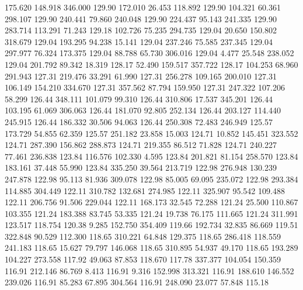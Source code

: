  175.620  148.918  346.000       129.90
 172.010   26.453  118.892       129.90
 104.321   60.361  298.107       129.90
 240.441   79.860  240.048       129.90
 224.437   95.143  241.335       129.90
 283.714  113.291   71.243       129.18
 102.726   75.235  294.735       129.04
  20.650  150.802  318.679       129.04
 193.295   94.238   15.141       129.04
 237.246   75.585  237.345       129.04
 297.977   76.324  173.375       129.04
  88.788   65.730  306.016       129.04
   4.477   25.548  238.052       129.04
 201.792   89.342   18.319       128.17
  52.490  159.517  357.722       128.17
 104.253   68.960  291.943       127.31
 219.476   33.291   61.990       127.31
 256.278  109.165  200.010       127.31
 106.149  154.210  334.670       127.31
 357.562   87.794  159.950       127.31
 247.322  107.206   58.299       126.44
 348.111  101.079   99.310       126.44
 310.806   17.537  345.201       126.44
 103.195   61.069  306.063       126.44
 181.070   92.805  252.134       126.44
 203.127  114.440  245.915       126.44
 186.332   30.506   94.063       126.44
 250.308   72.483  246.949       125.57
 173.729   54.855   62.359       125.57
 251.182   23.858   15.003       124.71
  10.852  145.451  323.552       124.71
 287.390  156.862  288.873       124.71
 219.355   86.512   71.828       124.71
 240.227   77.461  236.838       123.84
 116.576  102.330    4.595       123.84
 201.821   81.154  258.570       123.84
 183.161   37.448   55.990       123.84
 335.250   39.564  213.719       122.98
 276.948  130.239  247.878       122.98
  95.113   81.936  309.078       122.98
  85.005   69.095  235.072       122.98
 293.384  114.885  304.449       122.11
 310.782  132.681  274.985       122.11
 325.907   95.542  109.488       122.11
 206.756   91.506  229.044       122.11
 168.173   32.545   72.288       121.24
  25.500  110.867  103.355       121.24
 183.388   83.745   53.335       121.24
  19.738   76.175  111.665       121.24
 311.991  123.517  118.754       120.38
   9.285  152.750  354.409       119.66
 192.734   32.835   86.669       119.51
 322.848   90.529  112.300       118.65
 310.221   64.848  129.375       118.65
 286.418  118.559  241.183       118.65
  15.627   79.797  146.068       118.65
 310.895   54.937   49.170       118.65
 193.289  104.227  273.558       117.92
  49.063   87.853  118.670       117.78
 337.377  104.054  150.359       116.91
 212.146   86.769    8.413       116.91
   9.316  152.998  313.321       116.91
 188.610  146.552  239.026       116.91
  85.283   67.895  304.564       116.91
 248.090   23.077   57.848       115.18
